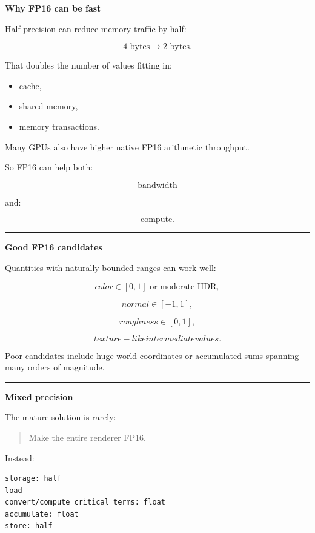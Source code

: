 \textbf{Why FP16 can be fast}

Half precision can reduce memory traffic by half:

\[
4\text{ bytes}
\rightarrow
2\text{ bytes}.
\]

That doubles the number of values fitting in:

\begin{itemize}
\tightlist
\item
  cache,
\item
  shared memory,
\item
  memory transactions.
\end{itemize}

Many GPUs also have higher native FP16 arithmetic throughput.

So FP16 can help both:

\[
\text{bandwidth}
\]

and:

\[
\text{compute}.
\]

\begin{center}\rule{0.5\linewidth}{0.5pt}\end{center}

\textbf{Good FP16 candidates}

Quantities with naturally bounded ranges can work well:

\[
color\in[0,1]\text{ or moderate HDR},
\]

\[
normal\in[-1,1],
\]

\[
roughness\in[0,1],
\]

\[
texture-like intermediate values.
\]

Poor candidates include huge world coordinates or accumulated sums spanning many orders of magnitude.

\begin{center}\rule{0.5\linewidth}{0.5pt}\end{center}

\textbf{Mixed precision}

The mature solution is rarely:

\begin{quote}
Make the entire renderer FP16.
\end{quote}

Instead:

\protect{}\label{p10-mixed}%
\begin{verbatim}
storage: half
load
convert/compute critical terms: float
accumulate: float
store: half
\end{verbatim}

